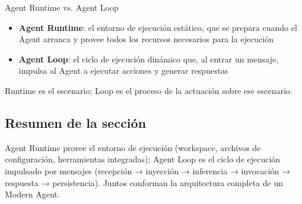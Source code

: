 \begin{knowledgebox}{Agent Runtime vs. Agent Loop}
\begin{itemize}
    \item \textbf{Agent Runtime}: el entorno de ejecución estático, que se prepara cuando el Agent arranca y provee todos los recursos necesarios para la ejecución
    \item \textbf{Agent Loop}: el ciclo de ejecución dinámico que, al entrar un mensaje, impulsa al Agent a ejecutar acciones y generar respuestas
\end{itemize}
Runtime es el escenario; Loop es el proceso de la actuación sobre ese escenario.
\end{knowledgebox}

\subsection{Resumen de la sección}

Agent Runtime provee el entorno de ejecución (workspace, archivos de configuración, herramientas integradas); Agent Loop es el ciclo de ejecución impulsado por mensajes (recepción → inyección → inferencia → invocación → respuesta → persistencia). Juntos conforman la arquitectura completa de un Modern Agent.



